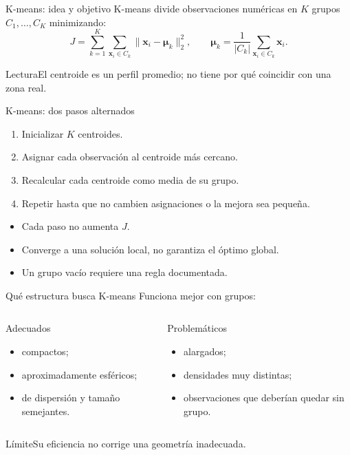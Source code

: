 \documentclass[aspectratio=169,10pt]{beamer}
\begin{document}
\begin{frame}{K-means: idea y objetivo}
  \small
  K-means divide observaciones numéricas en $K$ grupos $C_1,\ldots,C_K$ minimizando:
  \[J=\sum_{k=1}^{K}\sum_{\mathbf{x}_i\in C_k}\|\mathbf{x}_i-\boldsymbol{\mu}_k\|_2^2,\qquad \boldsymbol{\mu}_k=\frac{1}{|C_k|}\sum_{\mathbf{x}_i\in C_k}\mathbf{x}_i.\]
  \begin{block}{Lectura}El centroide es un perfil promedio; no tiene por qué coincidir con una zona real.\end{block}
\end{frame}

\begin{frame}{K-means: dos pasos alternados}
  \small
  \begin{enumerate}
    \item Inicializar $K$ centroides.
    \item Asignar cada observación al centroide más cercano.
    \item Recalcular cada centroide como media de su grupo.
    \item Repetir hasta que no cambien asignaciones o la mejora sea pequeña.
  \end{enumerate}
  \begin{itemize}
    \item Cada paso no aumenta $J$.
    \item Converge a una solución local, no garantiza el óptimo global.
    \item Un grupo vacío requiere una regla documentada.
  \end{itemize}
\end{frame}

\begin{frame}{Qué estructura busca K-means}
  \small
  Funciona mejor con grupos:
  \begin{columns}[T]
    \begin{block}{Adecuados}\begin{itemize}\item compactos;\item aproximadamente esféricos;\item de dispersión y tamaño semejantes.\end{itemize}\end{block}
    \begin{alertblock}{Problemáticos}\begin{itemize}\item alargados;\item densidades muy distintas;\item observaciones que deberían quedar sin grupo.\end{itemize}\end{alertblock}
  \end{columns}
  \begin{block}{Límite}Su eficiencia no corrige una geometría inadecuada.\end{block}
\end{frame}
\end{document}
